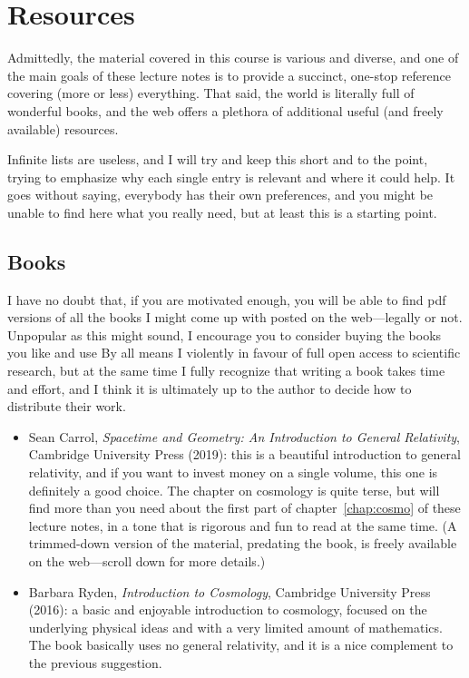 \chapter*{Resources}

Admittedly, the material covered in this course is various and diverse, and one
of the main goals of these lecture notes is to provide a succinct, one-stop
reference covering (more or less) everything. That said, the world is literally
full of wonderful books, and the web offers a plethora of additional useful
(and freely available) resources.

Infinite lists are useless, and I will try and keep this short and to the point,
trying to emphasize why each single entry is relevant and where it could help.
It goes without saying, everybody has their own preferences, and you might be unable
to find here what you really need, but at least this is a starting point.


\section*{Books}

I have no doubt that, if you are motivated enough, you will be able to find pdf
versions of all the books I might come up with posted on the web---legally or not.
Unpopular as this might sound, I encourage you to consider buying the books you
like and use
By all means I violently in favour of full open access to scientific research, but
at the same time I fully recognize that writing a book takes time and effort, and
I think it is ultimately up to the author to decide how to distribute their work.

\begin{itemize}
    \item Sean Carrol, \emph{Spacetime and Geometry: An Introduction to General Relativity},
    Cambridge University Press (2019): this is a beautiful introduction to general
    relativity, and if you want to invest money on a single volume, this one is
    definitely a good choice. The chapter on cosmology is quite terse, but will find
    more than you need about the first part of chapter~\ref{chap:cosmo} of these
    lecture notes, in a tone that is rigorous and fun to read at the same time.
    (A trimmed-down version of the material, predating the book, is freely
    available on the web---scroll down for more details.)
    \item Barbara Ryden, \emph{Introduction to Cosmology}, Cambridge University
    Press (2016): a basic and enjoyable introduction to cosmology, focused on the
    underlying physical ideas and with a very limited amount of mathematics. The
    book basically uses no general relativity, and it is a nice complement to the
    previous suggestion.
\end{itemize}



